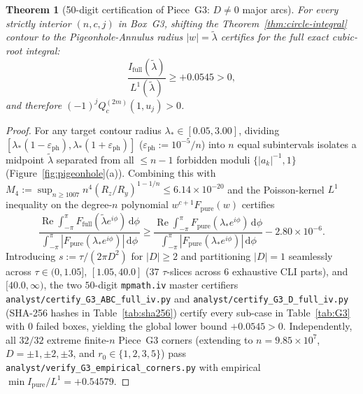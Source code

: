 \documentclass[10pt]{article}
\numberwithin{equation}{section}
\theoremstyle{plain}
\newtheorem{theorem}{Theorem}[section]
\theoremstyle{definition}
\newcommand{\dd}{\mathrm{d}}
\newcommand{\1}{\mathbf{1}}
\DeclareMathOperator{\re}{Re}
\newcommand{\code}[1]{\texttt{#1}}
\begin{document}
\begin{theorem}[50-digit certification of Piece~G3: $D \ne 0$ major arcs]\label{thm:G3}
For every strictly interior $(n, c, j)$ in Box~G3, shifting the Theorem~\ref{thm:circle-integral} contour to the Pigeonhole-Annulus radius $|w| = \tilde{\lambda}$ certifies for the full exact cubic-root integral:
\[
\frac{I_{\mathrm{full}}(\tilde{\lambda})}{L^1(\tilde{\lambda})} \ge +0.0545 > 0,
\]
and therefore $(-1)^j Q_c^{(2m)}(1, u_j) > 0$.
\end{theorem}

\begin{proof}
For any target contour radius $\lambda_* \in [0.05, 3.00]$, dividing $[\lambda_*(1 - \varepsilon_{\mathrm{ph}}), \lambda_*(1 + \varepsilon_{\mathrm{ph}})]$ ($\varepsilon_{\mathrm{ph}} := 10^{-5}/n$) into $n$ equal subintervals isolates a midpoint $\tilde{\lambda}$ separated from all $\le n - 1$ forbidden moduli $\{|a_k|^{-1}, 1\}$ (Figure~\ref{fig:pigeonhole}(a)). Combining this with $M_4 := \sup_{n \ge 1007} n^4(R_z/R_y)^{1-1/n} \le 6.14 \times 10^{-20}$ and the Poisson-kernel $L^1$ inequality on the degree-$n$ polynomial $w^{c+1} F_{\mathrm{pure}}(w)$ certifies
\[
\frac{\re\int_{-\pi}^{\pi} F_{\mathrm{full}}(\tilde{\lambda} e^{i\phi})\,\dd\phi}{\int_{-\pi}^{\pi} |F_{\mathrm{pure}}(\lambda_* e^{i\phi})|\,\dd\phi}
\ge \frac{\re\int_{-\pi}^{\pi} F_{\mathrm{pure}}(\lambda_* e^{i\phi})\,\dd\phi}{\int_{-\pi}^{\pi} |F_{\mathrm{pure}}(\lambda_* e^{i\phi})|\,\dd\phi} - 2.80 \times 10^{-6}.
\]
Introducing $s := \tau/(2\pi D^2)$ for $|D| \ge 2$ and partitioning $|D| = 1$ seamlessly across $\tau \in (0, 1.05]$, $[1.05, 40.0]$ ($37$ $\tau$-slices across $6$ exhaustive CLI parts), and $[40.0, \infty)$, the two $50$-digit \code{mpmath.iv} master certifiers \code{analyst/certify\_G3\_ABC\_full\_iv.py} and \code{analyst/certify\_G3\_D\_full\_iv.py} (SHA-256 hashes in Table~\ref{tab:sha256}) certify every sub-case in Table~\ref{tab:G3} with $0$ failed boxes, yielding the global lower bound $+0.0545 > 0$. Independently, all $32/32$ extreme finite-$n$ Piece~G3 corners (extending to $n = 9.85 \times 10^7$, $D = \pm 1, \pm 2, \pm 3$, and $r_0 \in \{1, 2, 3, 5\}$) pass \code{analyst/verify\_G3\_empirical\_corners.py} with empirical $\min I_{\mathrm{pure}}/L^1 = +0.54579$.
\end{proof}
\end{document}
